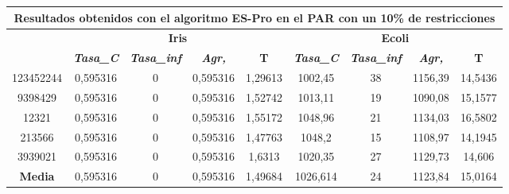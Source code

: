 \documentclass[12pt, spanish]{article}
\begin{document}
\begin{table}[H]
\begin{tabular}{|c|c|c|c|c|c|c|c|c|}
\hline
\multicolumn{9}{|c|}{\textbf{Resultados obtenidos con el algoritmo ES-Pro en el PAR con un 10\% de restricciones}}                                                                                                \\ \hline
\multirow{2}{*}{} & \multicolumn{4}{c|}{\textbf{Iris}}                                                            & \multicolumn{4}{c|}{\textbf{Ecoli}}                                                           \\ \cline{2-9} 
                  & \textit{\textbf{Tasa\_C}} & \textit{\textbf{Tasa\_inf}} & \textit{\textbf{Agr,}} & \textbf{T} & \textit{\textbf{Tasa\_C}} & \textit{\textbf{Tasa\_inf}} & \textit{\textbf{Agr,}} & \textbf{T} \\ \hline
123452244         & 0,595316                  & 0                           & 0,595316               & 1,29613    & 1002,45                   & 38                          & 1156,39                & 14,5436    \\ \hline
9398429           & 0,595316                  & 0                           & 0,595316               & 1,52742    & 1013,11                   & 19                          & 1090,08                & 15,1577    \\ \hline
12321             & 0,595316                  & 0                           & 0,595316               & 1,55172    & 1048,96                   & 21                          & 1134,03                & 16,5802    \\ \hline
213566            & 0,595316                  & 0                           & 0,595316               & 1,47763    & 1048,2                    & 15                          & 1108,97                & 14,1945    \\ \hline
3939021           & 0,595316                  & 0                           & 0,595316               & 1,6313     & 1020,35                   & 27                          & 1129,73                & 14,606     \\ \hline
\textbf{Media}    & 0,595316                  & 0                           & 0,595316               & 1,49684    & 1026,614                  & 24                          & 1123,84                & 15,0164    \\ \hline
\end{tabular}
\end{table}
\end{document}
